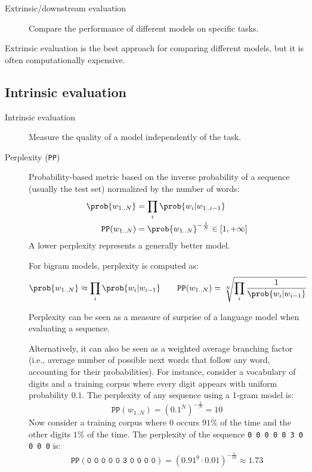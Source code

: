 \begin{description}
    \item[Extrinsic/downstream evaluation] 
        Compare the performance of different models on specific tasks.
\end{description}

\begin{remark}
    Extrinsic evaluation is the best approach for comparing different models, but it is often computationally expensive.
\end{remark}


\subsection{Intrinsic evaluation}

\begin{description}
    \item[Intrinsic evaluation] 
        Measure the quality of a model independently of the task.

    \item[Perplexity (\texttt{PP})] 
        Probability-based metric based on the inverse probability of a sequence (usually the test set) normalized by the number of words:
        \[
            \begin{split}
                \prob{w_{1..N}} &= \prod_{i} \prob{w_i | w_{1..i-1}} \\
                \texttt{PP}(w_{1..N}) &= \prob{w_{1..N}}^{-\frac{1}{N}} \in [1, +\infty]
            \end{split}
        \]
        A lower perplexity represents a generally better model.

        \begin{example}
            For bigram models, perplexity is computed as:
            \[ 
                \prob{w_{1..N}} \approx \prod_{i} \prob{w_i | w_{i-1}}
                \qquad
                \texttt{PP}(w_{1..N}) = \sqrt[N]{\prod_{i} \frac{1}{\prob{w_i | w_{i-1}}}}
            \]
        \end{example}

        \begin{remark}
            Perplexity can be seen as a measure of surprise of a language model when evaluating a sequence.

            Alternatively, it can also be seen as a weighted average branching factor (i.e., average number of possible next words that follow any word, accounting for their probabilities). For instance, consider a vocabulary of digits and a training corpus where every digit appears with uniform probability $0.1$. The perplexity of any sequence using a 1-gram model is:
            \[ \texttt{PP}(w_{1..N}) = \left( 0.1^{N} \right)^{-\frac{1}{N}} = 10 \]
            Now consider a training corpus where $0$ occurs $91\%$ of the time and the other digits $1\%$ of the time. The perplexity of the sequence \texttt{0 0 0 0 0 3 0 0 0 0} is:
            \[ \texttt{PP}(\texttt{0 0 0 0 0 3 0 0 0 0}) = \left( 0.91^9 \cdot 0.01 \right)^{-\frac{1}{10}} \approx 1.73 \]
        \end{remark}


\end{description}
